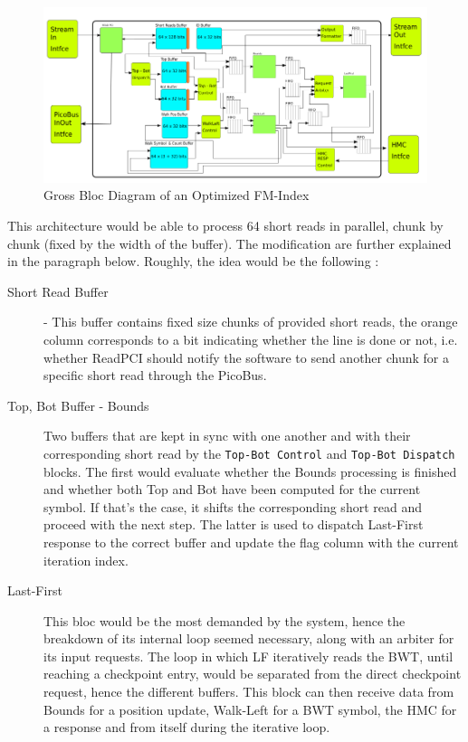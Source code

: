 \begin{figure}[H]
    \centering
    \includegraphics [scale = 0.5]{Figures/FM_OPTI.png}
    \caption{Gross Bloc Diagram of an Optimized FM-Index}
    \label{fig:FM_FIFO}
\end{figure}

This architecture would be able to process 64 short reads in parallel, chunk by chunk (fixed by the width of the buffer). The modification are further explained in the paragraph below.
Roughly, the idea would be the following :
\begin{description}
    \item [Short Read Buffer] - This buffer contains fixed size chunks of provided short reads, the orange column corresponds to a bit indicating whether the line is done or not, i.e. whether ReadPCI should notify the software to send another chunk for a specific short read through the PicoBus.
    \item [Top, Bot Buffer - Bounds] Two buffers that are kept in sync with one another and with their corresponding short read by the \texttt{Top-Bot Control} and \texttt{Top-Bot Dispatch} blocks. The first would evaluate whether the Bounds processing is finished and whether both Top and Bot have been computed for the current symbol. If that's the case, it shifts the corresponding short read and proceed with the next step. The latter is used to dispatch Last-First response to the correct buffer and update the flag column with the current iteration index.
    \item [Last-First] This bloc would be the most demanded by the system, hence the breakdown of its internal loop seemed necessary, along with an arbiter for its input requests. The loop in which LF iteratively reads the BWT, until reaching a checkpoint entry, would be separated from the direct checkpoint request, hence the different buffers. This block can then receive data from Bounds for a position update, Walk-Left for a BWT symbol, the HMC for a response and from itself during the iterative loop.
    
\end{description}

